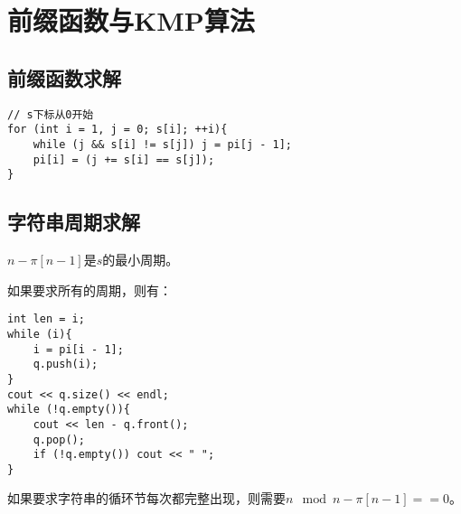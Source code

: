\section{前缀函数与KMP算法}
\subsection{前缀函数求解}
\begin{lstlisting}
// s下标从0开始
for (int i = 1, j = 0; s[i]; ++i){
    while (j && s[i] != s[j]) j = pi[j - 1];
    pi[i] = (j += s[i] == s[j]);
}
\end{lstlisting}
\subsection{字符串周期求解}
$n-\pi[n-1]$是$s$的最小周期。\par
如果要求所有的周期，则有：
\begin{lstlisting}
int len = i;
while (i){
    i = pi[i - 1];
    q.push(i);
}
cout << q.size() << endl;
while (!q.empty()){
    cout << len - q.front();
    q.pop();
    if (!q.empty()) cout << " ";
}
\end{lstlisting}\par
如果要求字符串的循环节每次都完整出现，则需要$n\mod n-\pi[n-1]==0$。

